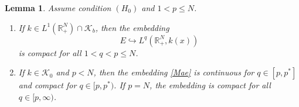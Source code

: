 \documentclass[12pt,reqno]{amsart}
\newtheorem{lemma}[theorem]{Lemma}
\begin{document}
 
\begin{lemma}\label{compactness} Assume condition $(H_0)$ and $1<p\leq N$. 
\begin{enumerate}
    \item If $k\in L^1(\mathds{R}^N_+)\cap \mathcal{K}_b$, then the embedding 
    \begin{equation}\label{Mae}
		E\hookrightarrow L^q\left(\mathds{R}^N_+,k(x)\right) 
	\end{equation}
 is compact for all $1<q<p\leq N$.
 \item If $k\in \mathcal{K}_0$ and  $p<N$, then the embedding \eqref{Mae}	is continuous for  $q \in [p,p^*]$ and compact for $q \in [p,p^*)$. If $p=N$, the embedding is  compact for all $q\in[p,\infty)$.
\end{enumerate}
\end{lemma} 
\end{document}
